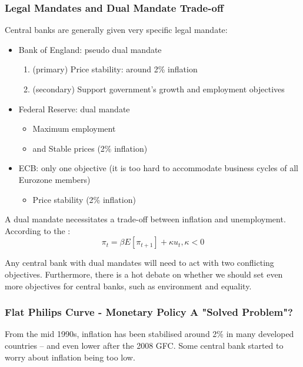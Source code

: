         \subsubsection{Legal Mandates and Dual Mandate Trade-off}
            Central banks are generally given very specific legal mandate:
            \begin{itemize}
                \item Bank of England: pseudo dual mandate
                \begin{enumerate}
                    \item (primary) Price stability: around 2\% inflation
                    \item (secondary) Support government's growth and employment objectives
                \end{enumerate}
                \item Federal Reserve: dual mandate
                \begin{itemize}
                    \item Maximum employment
                    \item and Stable prices (2\% inflation)
                \end{itemize}
                \item ECB: only one objective (it is too hard to accommodate business cycles of all Eurozone members)
                    \begin{itemize}
                        \item Price stability (2\% inflation)
                    \end{itemize}
            \end{itemize}

            A dual mandate necessitates a trade-off between inflation and unemployment. According to the :
            $$\pi_t = \beta E[\pi_{t+1}]+\kappa u_t, \kappa<0$$
            
            Any central bank with dual mandates will need to act with two conflicting objectives. Furthermore, there is a hot debate on whether we should set even more objectives for central banks, such as environment and equality.
        
        \subsubsection{Flat Philips Curve - Monetary Policy A "Solved Problem"? }
            From the mid 1990s, inflation has been stabilised around 2\% in many developed countries -- and even lower after the 2008 GFC. Some central bank started to worry about inflation being too low.

